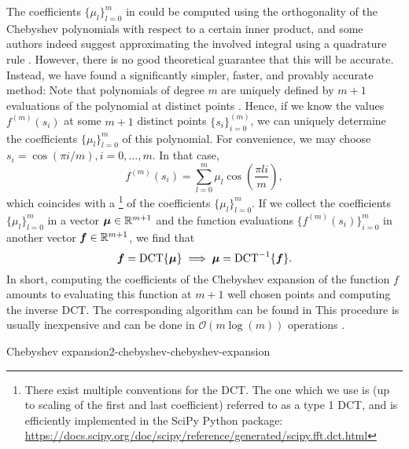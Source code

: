 The coefficients $\{\mu_l\}_{l=0}^{m}$ in 
could be computed using the orthogonality of the Chebyshev polynomials with respect
to a certain inner product, and some authors indeed suggest approximating the
involved integral using a quadrature rule \cite[algorithm~1]{lin2017randomized}.
However, there is no good theoretical guarantee that this will be accurate. Instead, we
have found a significantly simpler, faster, and provably accurate method:
Note that polynomials of degree $m$ are uniquely defined by $m+1$
evaluations of the polynomial at distinct points \cite{gauss1799demonstratio}.
Hence, if we know the values $f^{(m)}(s_i)$ at some $m+1$ distinct points 
$\{s_i\}_{i=0}^(m)$, we can uniquely determine the coefficients $\{\mu_l\}_{l=0}^{m}$
of this polynomial. For convenience, we may choose $s_i = \cos(\pi i/m), i=0,\dots,m$.
In that case,
\begin{equation}
    f^{(m)}(s_i) = \sum_{l=0}^{m} \mu_l \cos\left(\frac{\pi l i}{m}\right),
    \label{equ:2-chebyshev-chebyshev-nodes-evaluation}
\end{equation}
which coincides with a \footnote{There exist multiple conventions for the DCT.
The one which we use is (up to scaling of the first and last coefficient)
referred to as a type 1 DCT, and is efficiently implemented in the SciPy Python package:
\url{https://docs.scipy.org/doc/scipy/reference/generated/scipy.fft.dct.html}} of the coefficients $\{\mu_l\}_{l=0}^{m}$.
If we collect the coefficients $\{\mu_l\}_{l=0}^{m}$ in a vector $\boldsymbol{\mu} \in \mathbb{R}^{m+1}$ 
and the function evaluations $\{f^{(m)}(s_i)\}_{i=0}^{m}$ in another
vector $\boldsymbol{f} \in \mathbb{R}^{m+1}$, we find that
\begin{equation}
    \boldsymbol{f} = \operatorname{DCT} \{ \boldsymbol{\mu} \} \implies \boldsymbol{\mu} = \operatorname{DCT}^{-1}\{ \boldsymbol{f} \}.
    \label{equ:2-chebyshev-chebyshev-DCT}
\end{equation}
In short, computing the coefficients of the Chebyshev expansion 
of the function $f$ amounts to evaluating this function at $m+1$ well
chosen points and computing the inverse \gls{DCT}. The corresponding algorithm
can be found in 
This procedure is usually inexpensive and can be done in $\mathcal{O}(m \log(m))$
operations \cite{makhoul1980fct}.

\begin{algo}{Chebyshev expansion}{2-chebyshev-chebyshev-expansion}
    
\end{algo}

